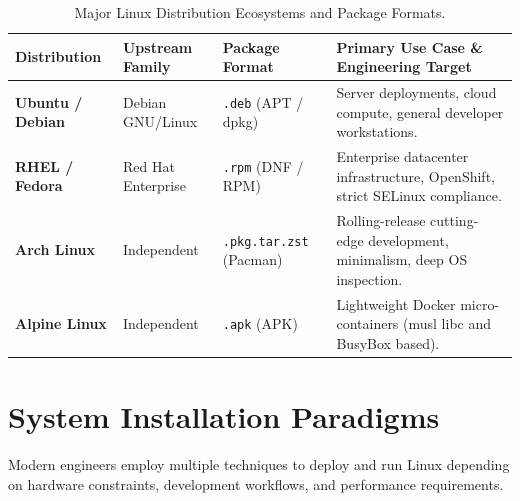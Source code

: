 \begin{table}[htbp]
\centering
\small
\begin{tabularx}{\linewidth}{l l l X}
\toprule
\textbf{Distribution} & \textbf{Upstream Family} & \textbf{Package Format} & \textbf{Primary Use Case \& Engineering Target} \\
\midrule
\textbf{Ubuntu / Debian} & Debian GNU/Linux & \texttt{.deb} (APT / dpkg) & Server deployments, cloud compute, general developer workstations. \\
\textbf{RHEL / Fedora} & Red Hat Enterprise & \texttt{.rpm} (DNF / RPM) & Enterprise datacenter infrastructure, OpenShift, strict SELinux compliance. \\
\textbf{Arch Linux} & Independent & \texttt{.pkg.tar.zst} (Pacman) & Rolling-release cutting-edge development, minimalism, deep OS inspection. \\
\textbf{Alpine Linux} & Independent & \texttt{.apk} (APK) & Lightweight Docker micro-containers (musl libc and BusyBox based). \\
\bottomrule
\end{tabularx}
\caption{Major Linux Distribution Ecosystems and Package Formats.}
\label{tab:distros}
\end{table}

\section{System Installation Paradigms}
Modern engineers employ multiple techniques to deploy and run Linux depending on hardware constraints, development workflows, and performance requirements.

